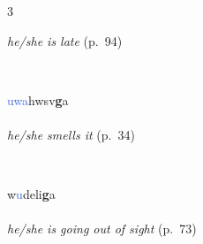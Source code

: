 \documentclass[oneside,openany]{book}%
\begin{document}
\begin{multicols}{3}
\begin{minipage}[t]{\linewidth}
\noindent \textit{he/she is late} (p.~94)
\end{minipage}\\[1em]%
\begin{minipage}[t]{\linewidth}
\raggedright\noindent \textcolor{RoyalBlue}{uwa}hwsv\textbf{g}a\\
\\
\noindent \textit{he/she smells it} (p.~34)
\end{minipage}\\[1em]%
\begin{minipage}[t]{\linewidth}
\raggedright\noindent w\textcolor{RoyalBlue}{u}deli\textbf{g}a\\
\\
\noindent \textit{he/she is going out of sight} (p.~73)
\end{minipage}\\[1em]%
\end{multicols}%
\vspace{1em}%
\needspace{1.5in}%
\end{document}
